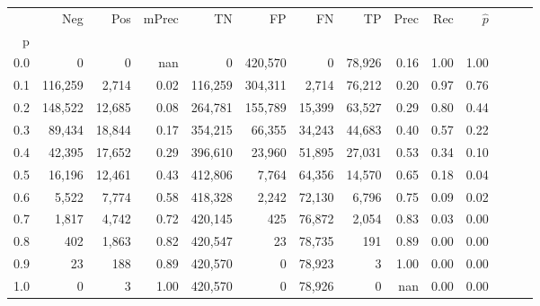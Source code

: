 \begin{tabular}{rrrrrrrrrrrrrr}
\toprule
{} &      Neg &     Pos & mPrec &       TN &       FP &      FN &      TP &  Prec &   Rec & $\hat{p}$ \\
p   &          &         &       &          &          &         &         &       &       &           \\
\midrule
0.0 &        0 &       0 &   nan &        0 &  420,570 &       0 &  78,926 &  0.16 &  1.00 &      1.00 \\
0.1 &  116,259 &   2,714 &  0.02 &  116,259 &  304,311 &   2,714 &  76,212 &  0.20 &  0.97 &      0.76 \\
0.2 &  148,522 &  12,685 &  0.08 &  264,781 &  155,789 &  15,399 &  63,527 &  0.29 &  0.80 &      0.44 \\
0.3 &   89,434 &  18,844 &  0.17 &  354,215 &   66,355 &  34,243 &  44,683 &  0.40 &  0.57 &      0.22 \\
0.4 &   42,395 &  17,652 &  0.29 &  396,610 &   23,960 &  51,895 &  27,031 &  0.53 &  0.34 &      0.10 \\
0.5 &   16,196 &  12,461 &  0.43 &  412,806 &    7,764 &  64,356 &  14,570 &  0.65 &  0.18 &      0.04 \\
0.6 &    5,522 &   7,774 &  0.58 &  418,328 &    2,242 &  72,130 &   6,796 &  0.75 &  0.09 &      0.02 \\
0.7 &    1,817 &   4,742 &  0.72 &  420,145 &      425 &  76,872 &   2,054 &  0.83 &  0.03 &      0.00 \\
0.8 &      402 &   1,863 &  0.82 &  420,547 &       23 &  78,735 &     191 &  0.89 &  0.00 &      0.00 \\
0.9 &       23 &     188 &  0.89 &  420,570 &        0 &  78,923 &       3 &  1.00 &  0.00 &      0.00 \\
1.0 &        0 &       3 &  1.00 &  420,570 &        0 &  78,926 &       0 &   nan &  0.00 &      0.00 \\
\bottomrule
\end{tabular}
